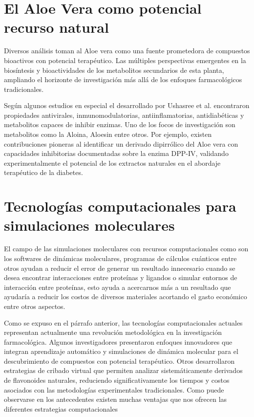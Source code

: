  \section {El Aloe Vera como potencial recurso natural}
 Diversos análisis toman al Aloe vera como una fuente prometedora de compuestos bioactivos con potencial terapéutico. Las múltiples perspectivas emergentes en la biosíntesis y bioactividades de los metabolitos secundarios de esta planta, ampliando el horizonte de investigación más allá de los enfoques farmacológicos tradicionales. %

 Según algunos estudios en especial el desarrollado por Ushasree et al. encontraron propiedades antivirales, inmunomodulatorias, antiinflamatorias, antidiabéticas y metabolitos capaces de inhibir enzimas. Uno de los focos de investigación son metabolitos como la Aloina, Aloesin entre otros.%
 Por ejemplo, existen contribuciones pioneras al identificar un derivado dipirrólico del Aloe vera con capacidades inhibitorias documentadas sobre la enzima DPP-IV, validando experimentalmente el potencial de los extractos naturales en el abordaje terapéutico de la diabetes.%

 \section{Tecnologías computacionales para simulaciones moleculares}
 El campo de las simulaciones moleculares con recursos computacionales como son los softwares de dinámicas moleculares, programas de cálculos cuánticos entre otros ayudan a reducir el error de generar un resultado innecesario cuando se desea encontrar interacciones entre proteínas y ligandos o simular entornos de interacción entre proteínas, esto ayuda a acercarnos más a un resultado que ayudaría a reducir los costos de diversos materiales acortando el gasto económico entre otros aspectos.
 
 Como se expuso en el párrafo anterior, las tecnologías computacionales actuales representan actualmente una revolución metodológica en la investigación farmacológica. Algunos investigadores presentaron enfoques innovadores que integran aprendizaje automático y simulaciones de dinámica molecular para el descubrimiento de compuestos con potencial terapéutico.%
 Otros desarrollaron estrategias de cribado virtual que permiten analizar sistemáticamente derivados de flavonoides naturales, reduciendo significativamente los tiempos y costos asociados con las metodologías experimentales tradicionales. %
 Como puede observarse en los antecedentes existen muchas ventajas que nos ofrecen las diferentes estrategias computacionales

